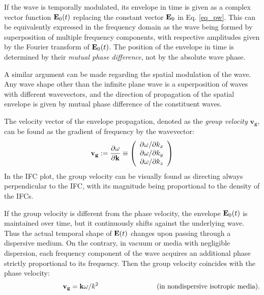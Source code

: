If the wave is temporally modulated, its envelope in time is given as a complex vector function $\mathbf{E}_0(t)$ replacing the constant vector $\mathbf{E}_0$ in Eq. \ref{eq_pw}. This can be equivalently expressed in the frequency domain as the wave being formed by superposition of multiple frequency components, with respective amplitudes given by the Fourier transform of $\mathbf{E}_0(t)$. The position of the envelope in time is determined by their \textit{mutual phase difference}, not by the absolute wave phase. 

A similar argument can be made regarding the spatial modulation of the wave. Any wave shape other than the infinite plane wave is a superposition of waves with different wavevectors, and the direction of propagation of the spatial envelope is given by mutual phase difference of the constituent waves. %

The velocity vector of the envelope propagation, denoted as the \textit{group velocity} $\mathbf{v_g}$, can be found as the gradient of frequency by the wavevector: %
\begin{equation} \mathbf{v_g} := \frac{\partial \omega}{\partial {\mathbf{k}}} \equiv 
\left(\begin{array}{c} 
	\partial \omega/\partial k_x \\ 
	\partial \omega/\partial k_y \\ 
	\partial \omega/\partial k_z \\ 
	\end{array} \right)
 \label{eq_vg}\end{equation}
In the IFC plot, the group velocity can be visually found as directing always perpendicular to the IFC, with its magnitude being proportional to the density of the IFCs.

If the group velocity is different from the phase velocity, the envelope $\mathbf{E}_0(t)$ is maintained over time, but it continuously shifts against the underlying wave. Thus the actual temporal shape of $\mathbf{E}(t)$ changes upon passing through a dispersive medium.
On the contrary, in vacuum or media with negligible dispersion, each frequency component of the wave acquires an additional phase strictly proportional to its frequency. Then the group velocity coincides with the phase velocity: 
$$\hspace{3cm}\mathbf{v_g} = \kk \omega / k^2 \hspace{3cm} \text{(in nondispersive isotropic media)}.$$

